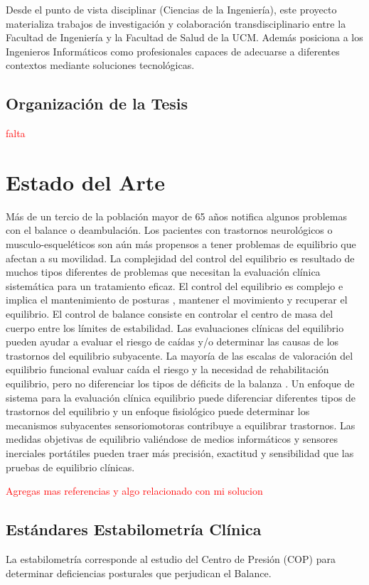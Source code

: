 \documentclass[12pt,a4paper]{article}
\begin{document}
Desde el punto de vista disciplinar (Ciencias de la Ingeniería), este proyecto materializa trabajos de investigación y colaboración transdisciplinario entre la Facultad de Ingeniería y la Facultad de Salud de la UCM. Además posiciona a los Ingenieros Informáticos como profesionales capaces de adecuarse a diferentes contextos mediante soluciones tecnológicas.

\subsection{Organizaci\'on de la Tesis}
\textcolor{red}{falta}


\section{Estado del Arte}

Más de un tercio de la población mayor de 65 años notifica algunos problemas con el balance o deambulación. Los pacientes con trastornos neurológicos o musculo-esqueléticos son aún más propensos a tener problemas de equilibrio que afectan a su movilidad. La complejidad del control del equilibrio es resultado  de muchos tipos diferentes de problemas que necesitan la evaluación clínica sistemática para un tratamiento eficaz.
El control del equilibrio es complejo e implica el mantenimiento de posturas \cite{mancini_relevance_2010}, mantener el movimiento y recuperar el equilibrio. El control de balance consiste en controlar el centro de masa del cuerpo entre los límites de estabilidad. Las evaluaciones clínicas del equilibrio pueden ayudar a evaluar el riesgo de caídas y/o determinar las causas de los trastornos del equilibrio subyacente. 
La mayoría de las escalas de valoración del equilibrio funcional evaluar caída el riesgo y la necesidad de rehabilitación equilibrio, pero no diferenciar los tipos de déficits de la balanza . Un enfoque de sistema para la evaluación clínica equilibrio puede diferenciar diferentes tipos de trastornos del equilibrio y un enfoque fisiológico puede determinar los mecanismos subyacentes sensoriomotoras contribuye a equilibrar trastornos. Las medidas objetivas de equilibrio valiéndose de medios informáticos y sensores inerciales portátiles pueden traer más precisión, exactitud y sensibilidad que las pruebas de equilibrio clínicas.

\textcolor{red}{Agregas mas referencias y algo relacionado con mi solucion}


\subsection{Estándares Estabilometría Clínica}
La estabilometría corresponde al estudio del Centro de Presión (COP) para determinar deficiencias posturales que perjudican el Balance.
\end{document}
